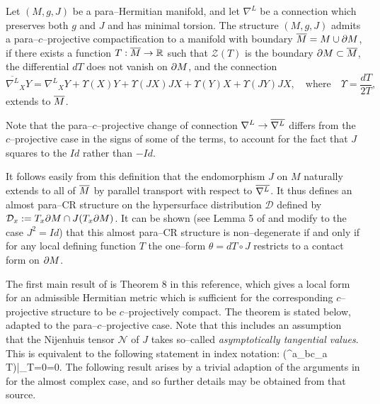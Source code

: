 \begin{defi}
\label{defi_1}  Let $(M,g,J)$ be a para--Hermitian manifold, and let $\nabla^L$ be a connection which preserves both $g$ and $J$ and has minimal torsion. The structure $(M, g, J)$
admits a para--$c$--projective compactification to a manifold with boundary $\overline{M}=M\cup\partial M$,
if there exists a function $T:\overline{M}\rightarrow \mathbb{R}$ such that $\mathcal{Z}(T)$ is the boundary
$\partial M\subset \overline{M}$, the differential $dT$ does not vanish on $\partial M$, and the
connection
\[
\overline{\nabla^L}_X Y={\nabla^L}_X Y+\Upsilon(X)Y+\Upsilon(JX)JX
+\Upsilon(Y)X+\Upsilon(JY)JX, \quad\mbox{where}\quad\Upsilon=\frac{dT}{2T},
\]
extends to $\overline{M}$.
\end{defi}

Note that the para--$c$--projective change of connection $\nabla^L\rightarrow \overline{\nabla^L}$ differs from the $c$--projective case in the signs of some of the terms, to account for the fact that $J$ squares to the $Id$ rather than $-Id$.

It follows easily from this definition that the endomorphism $J$ on $M$ naturally extends to all of $\overline{M}$ by parallel transport with respect to $\overline{\nabla^L}$. It thus defines an almost para--CR structure on the hypersurface distribution $\mathcal{D}$ defined by $\mathcal{D}_x:=T_x\partial M \cap J(T_x \partial M)$. It can be shown (see Lemma 5 of \cite{CG} and modify to the case $J^2=Id$) that this almost para--CR structure is non--degenerate if and only if for any local defining function $T$ the one--form $\theta=dT\circ J$ restricts to a contact form on $\partial M$.

The first main result of \cite{CG} is  Theorem 8 in this reference, which gives a local form for an admissible Hermitian metric which is sufficient for the corresponding $c$--projective structure to be $c$--projectively compact. The theorem is stated below, adapted to the para--$c$--projective case. Note that this includes an assumption that the Nijenhuis tensor $\mathcal{N}$ of $J$ takes so--called \textit{asymptotically tangential values}. This is equivalent to the following statement in index notation:
\be
\label{Nijenhuis_condition}
\Big({^{a}}_{bc}\nabla_a T\Big)|_{T=0}=0.  \ee
The
following result arises by a trivial adaption of the arguments in
\cite{CG} for the almost complex case, and so further details may be obtained from that source.

